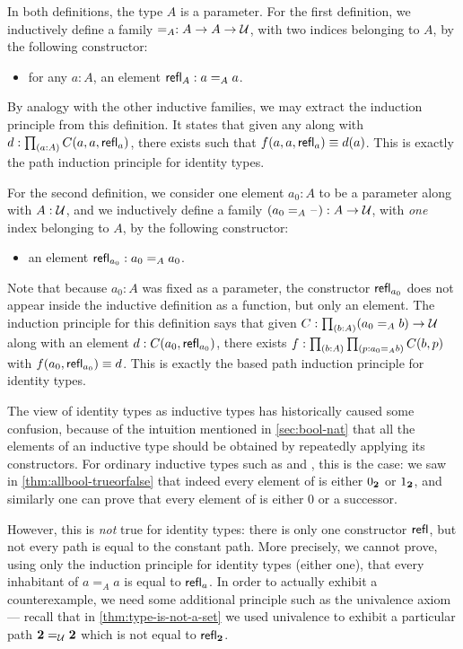 In both definitions, the type $A$ is a parameter.
For the first definition, we inductively define a family $=_A : A\to A\to \mathcal{U}$, with two indices belonging to $A$, by the following constructor:
\begin{itemize}
\item for any $a:A$, an element $\mathsf{refl}_{A} : a=_A a$.
\end{itemize}
By analogy with the other inductive families, we may extract the induction principle from this definition.
It states that given any  along with $d:\prd{a:A} C(a,a,\refl{a})$, there exists  such that $f(a,a,\mathsf{refl}_{a})\equiv d(a)$.
This is exactly the path induction principle for identity types.

For the second definition, we consider one element $a_0:A$ to be a parameter along with $A:\mathcal{U}$, and we inductively define a family $(a_0 =_A \mathord{\hspace{1pt}\text{--}\hspace{1pt}}):A\to \mathcal{U}$, with \emph{one} index belonging to $A$, by the following constructor:
\begin{itemize}
\item an element $\mathsf{refl}_{a_0} : a_0 =_A a_0$.
\end{itemize}
Note that because $a_0:A$ was fixed as a parameter, the constructor $\mathsf{refl}_{a_0}$ does not appear inside the inductive definition as a function, but only an element.
The induction principle for this definition says that given $C:\prd{b:A} (a_0 =_A b) \to \type$ along with an element $d:C(a_0,\mathsf{refl}_{a_0})$, there exists $f:\prd{b:A}{p:a_0 =_A b} C(b,p)$ with $f(a_0,\mathsf{refl}_{a_0})\equiv d$.
This is exactly the based path induction principle for identity types.

The view of identity types as inductive types has historically caused some confusion, because of the intuition mentioned in \autoref{sec:bool-nat} that all the elements of an inductive type should be obtained by repeatedly applying its constructors.
For ordinary inductive types such as \bool and \nat, this is the case: we saw in \autoref{thm:allbool-trueorfalse} that indeed every element of \bool is either ${0_{\mathbf{2}}}$ or ${1_{\mathbf{2}}}$, and similarly one can prove that every element of \nat is either $0$ or a successor.

However, this is \emph{not} true for identity types: there is only one constructor $\mathsf{refl}_{}$, but not every path is equal to the constant path.
More precisely, we cannot prove, using only the induction principle for identity types (either one), that every inhabitant of $a=_A a$ is equal to $\mathsf{refl}_{a}$.
In order to actually exhibit a counterexample, we need some additional principle such as the univalence axiom --- recall that in \autoref{thm:type-is-not-a-set} we used univalence to exhibit a particular path $\mathbf{2}=_\mathcal{U}\mathbf{2}$ which is not equal to $\mathsf{refl}_{\mathbf{2}}$.

